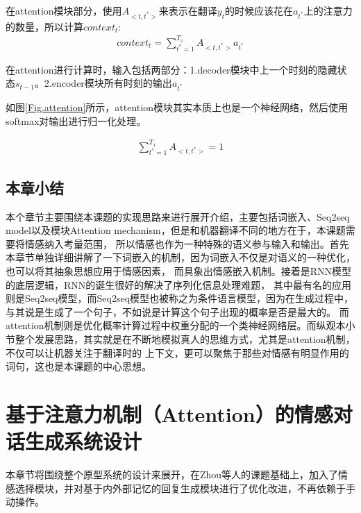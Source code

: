 \documentclass[supercite]{HustGraduPaper}
\theoremstyle{definition}
\begin{document}
在attention模块部分，使用$A_{<t,t^*>}$来表示在翻译$y_{t}$的时候应该花在$a_{t^*}$上的注意力的数量，所以计算$context_{t}$:
\begin{align}
  context_{t} = \sum_{t^*=1}^{T_x}{A_{<t,t^{*}>}}a_{t^*} \label{6}
\end{align}

在attention进行计算时，输入包括两部分：1.decoder模块中上一个时刻的隐藏状态$s_{t-1}$。2.encoder模块所有时刻的输出$a_{t^*}$

如图\ref{Fig.attention}所示，attention模块其实本质上也是一个神经网络，然后使用softmax对输出进行归一化处理。

\begin{align}
  \sum_{t^*=1}^{T_x}{A_{<t,t^{*}>}}=1 \label{7}
\end{align}

\subsection{本章小结}
本个章节主要围绕本课题的实现思路来进行展开介绍，主要包括词嵌入、Seq2seq model以及模块Attention mechanism，但是和机器翻译不同的地方在于，本课题需要将情感纳入考量范围，
所以情感也作为一种特殊的语义参与输入和输出。首先本章节单独详细讲解了一下词嵌入的机制，因为词嵌入不仅是对语义的一种优化，也可以将其抽象思想应用于情感因素，
而具象出情感嵌入机制。接着是RNN模型的底层逻辑，RNN的诞生很好的解决了序列化信息处理难题，
其中最有名的应用则是Seq2seq模型，而Seq2seq模型也被称之为条件语言模型，因为在生成过程中，与其说是生成了一个句子，不如说是计算这个句子出现的概率是否是最大的。
而attention机制则是优化概率计算过程中权重分配的一个类神经网络层。而纵观本小节整个发展思路，其实就是在不断地模拟真人的思维方式，尤其是attention机制，不仅可以让机器关注于翻译时的
上下文，更可以聚焦于那些对情感有明显作用的词句，这也是本课题的中心思想。

\section{基于注意力机制（Attention）的情感对话生成系统设计}
本章节将围绕整个原型系统的设计来展开，在Zhou\cite{DBLP:journals/corr/ZhouHZZL17}等人的课题基础上，加入了情感选择模块，并对基于内外部记忆的回复生成模块进行了优化改进，不再依赖于手动操作。
\end{document}
